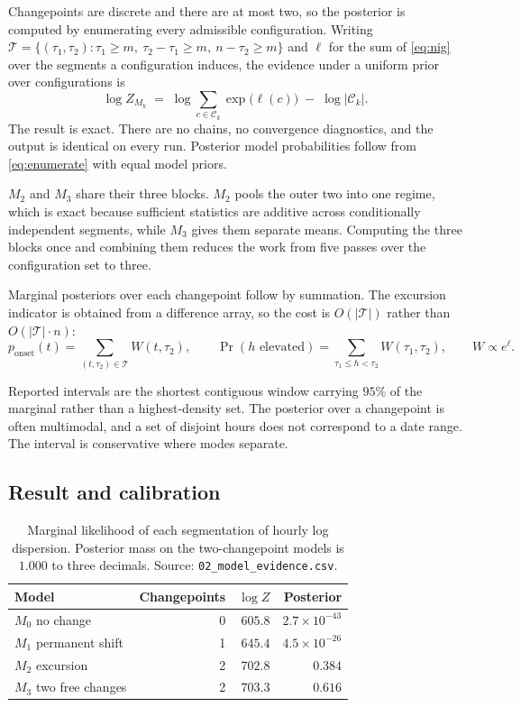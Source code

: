 \documentclass[11pt,a4paper]{article}
\newcommand{\code}[1]{\texttt{\small #1}}
\begin{document}
Changepoints are discrete and there are at most two, so the posterior is computed by
enumerating every admissible configuration. Writing
$\mathcal{T} = \{(\tau_1,\tau_2) : \tau_1 \geq m,\ \tau_2 - \tau_1 \geq m,\ n - \tau_2 \geq m\}$
and $\ell$ for the sum of \eqref{eq:nig} over the segments a configuration induces, the
evidence under a uniform prior over configurations is
\begin{equation}
\log Z_{M_k} \;=\; \log \sum_{c \in \mathcal{C}_k} \exp\bigl(\ell(c)\bigr)
\;-\; \log |\mathcal{C}_k| .
\label{eq:enumerate}
\end{equation}
The result is exact. There are no chains, no convergence diagnostics, and the output is
identical on every run. Posterior model probabilities follow from \eqref{eq:enumerate} with
equal model priors.

$M_2$ and $M_3$ share their three blocks. $M_2$ pools the outer two into one regime, which
is exact because sufficient statistics are additive across conditionally independent
segments, while $M_3$ gives them separate means. Computing the three blocks once and
combining them reduces the work from five passes over the configuration set to three.

Marginal posteriors over each changepoint follow by summation. The excursion indicator is
obtained from a difference array, so the cost is $O(|\mathcal{T}|)$ rather than
$O(|\mathcal{T}| \cdot n)$:
\[
p_{\text{onset}}(t) = \!\!\sum_{(t,\tau_2) \in \mathcal{T}}\!\! W(t,\tau_2),
\qquad
\Pr(h \text{ elevated}) = \!\!\sum_{\tau_1 \leq h < \tau_2}\!\! W(\tau_1,\tau_2),
\qquad
W \propto e^{\ell}.
\]

Reported intervals are the shortest contiguous window carrying $95\%$ of the marginal rather
than a highest-density set. The posterior over a changepoint is often multimodal, and a set
of disjoint hours does not correspond to a date range. The interval is conservative where
modes separate.

\subsection{Result and calibration}

\begin{table}[htbp]
\centering
\small
\begin{tabular}{@{}lrrr@{}}
\toprule
Model & Changepoints & $\log Z$ & Posterior \\
\midrule
$M_0$ no change            & 0 & $605.8$ & $2.7\times10^{-43}$ \\
$M_1$ permanent shift      & 1 & $645.4$ & $4.5\times10^{-26}$ \\
$M_2$ excursion            & 2 & $702.8$ & $0.384$ \\
$M_3$ two free changes     & 2 & $703.3$ & $0.616$ \\
\bottomrule
\end{tabular}
\caption{Marginal likelihood of each segmentation of hourly log dispersion. Posterior mass
on the two-changepoint models is $1.000$ to three decimals. Source:
\code{02\_model\_evidence.csv}.}
\end{table}
\end{document}
